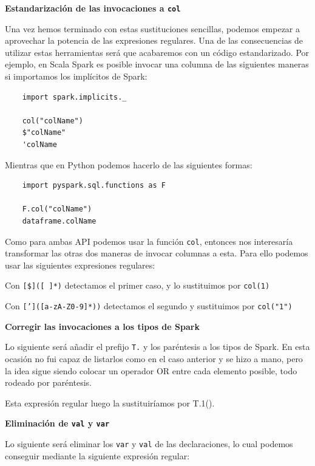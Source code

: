 \documentclass[12pt,twoside,titlepage]{report}
\begin{document}
\textbf{Estandarización de las invocaciones a \texttt{col}}

Una vez hemos terminado con estas sustituciones sencillas, podemos empezar a aprovechar la potencia de las expresiones regulares. Una de las consecuencias de utilizar estas herramientas será que acabaremos con un código estandarizado. Por ejemplo, en Scala Spark es posible invocar una columna de las siguientes maneras si importamos los implícitos de Spark:

\begin{lstlisting}
	import spark.implicits._
	
	col("colName")
	$"colName"
	'colName
\end{lstlisting}

Mientras que en Python podemos hacerlo de las siguientes formas:

\begin{lstlisting}
	import pyspark.sql.functions as F
	
	F.col("colName")
	dataframe.colName
\end{lstlisting}

Como para ambas API podemos usar la función \texttt{col}, entonces nos interesaría transformar las otras dos maneras de invocar columnas a esta. Para ello podemos usar las siguientes expresiones regulares:
\begin{compactitem}
	\item Con \texttt{[\$]([ ]*)} detectamos el primer caso, y lo sustituimos por \texttt{col(1)}
	\item Con \texttt{[']([a-zA-Z0-9]*))} detectamos el segundo y sustituimos por \texttt{col("1")}
\end{compactitem}

\textbf{Corregir las invocaciones a los tipos de Spark}

Lo siguiente será añadir el prefijo \texttt{T.} y los paréntesis a los tipos de Spark. En esta ocasión no fui capaz de listarlos como en el caso anterior y se hizo a mano, pero la idea sigue siendo colocar un operador OR entre cada elemento posible, todo rodeado por paréntesis.

Esta expresión regular luego la sustituiríamos por T.1().


\textbf{Eliminación de \texttt{val} y \texttt{var}}

Lo siguiente será eliminar los \texttt{var} y \texttt{val} de las declaraciones, lo cual podemos conseguir mediante la siguiente expresión regular:
\end{document}
